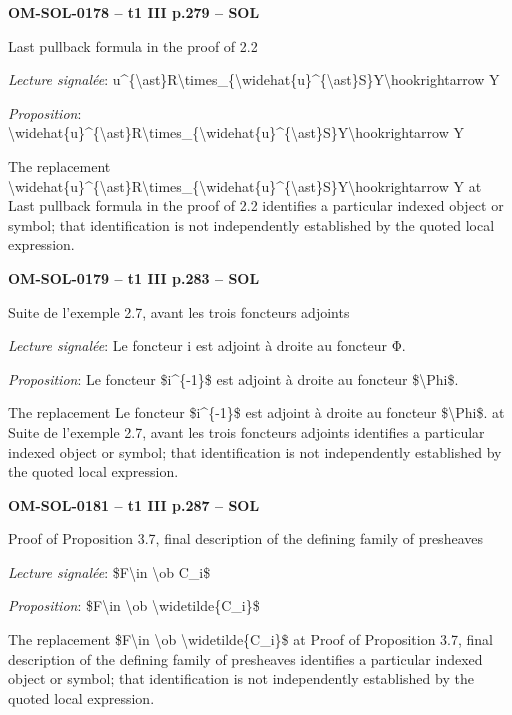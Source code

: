 \par\noindent\textbf{OM-SOL-0178 -- t1 III p.279 -- SOL}\par
Last pullback formula in the proof of 2.2\par
\emph{Lecture signalée}: u\textasciicircum{}\{\textbackslash{}ast\}R\textbackslash{}times\_\{\textbackslash{}widehat\{u\}\textasciicircum{}\{\textbackslash{}ast\}S\}Y\textbackslash{}hookrightarrow Y\par
\emph{Proposition}: \textbackslash{}widehat\{u\}\textasciicircum{}\{\textbackslash{}ast\}R\textbackslash{}times\_\{\textbackslash{}widehat\{u\}\textasciicircum{}\{\textbackslash{}ast\}S\}Y\textbackslash{}hookrightarrow Y\par
The replacement \textbackslash{}widehat\{u\}\textasciicircum{}\{\textbackslash{}ast\}R\textbackslash{}times\_\{\textbackslash{}widehat\{u\}\textasciicircum{}\{\textbackslash{}ast\}S\}Y\textbackslash{}hookrightarrow Y at Last pullback formula in the proof of 2.2 identifies a particular indexed object or symbol; that identification is not independently established by the quoted local expression.\par
\par\noindent\textbf{OM-SOL-0179 -- t1 III p.283 -- SOL}\par
Suite de l'exemple 2.7, avant les trois foncteurs adjoints\par
\emph{Lecture signalée}: Le foncteur i est adjoint à droite au foncteur Φ.\par
\emph{Proposition}: Le foncteur \$i\textasciicircum{}\{-1\}\$ est adjoint à droite au foncteur \$\textbackslash{}Phi\$.\par
The replacement Le foncteur \$i\textasciicircum{}\{-1\}\$ est adjoint à droite au foncteur \$\textbackslash{}Phi\$. at Suite de l'exemple 2.7, avant les trois foncteurs adjoints identifies a particular indexed object or symbol; that identification is not independently established by the quoted local expression.\par
\par\noindent\textbf{OM-SOL-0181 -- t1 III p.287 -- SOL}\par
Proof of Proposition 3.7, final description of the defining family of presheaves\par
\emph{Lecture signalée}: \$F\textbackslash{}in \textbackslash{}ob C\_i\$\par
\emph{Proposition}: \$F\textbackslash{}in \textbackslash{}ob \textbackslash{}widetilde\{C\_i\}\$\par
The replacement \$F\textbackslash{}in \textbackslash{}ob \textbackslash{}widetilde\{C\_i\}\$ at Proof of Proposition 3.7, final description of the defining family of presheaves identifies a particular indexed object or symbol; that identification is not independently established by the quoted local expression.\par
